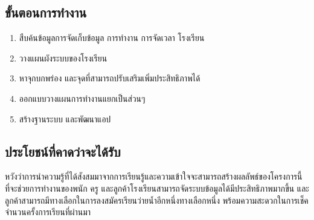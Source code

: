\subsection{ขั้นตอนการทำงาน}

\begin{enumerate}
    \item สืบค้นข้อมูลการจัดเก็บข้อมูล การทำงาน การจัดเวลา โรงเรียน
    \item วางแผนผังระบบของโรงเรียน
    \item หาจุกบกพร่อง และจุดที่สามารถปรับเสริมเพิ่มประสิทธิภาพได้
    \item ออกแบบวางแผนการทำงานแยกเป็นส่วนๆ
    \item สร้างฐานระบบ และพัฒนาแอป
\end{enumerate}

\subsection{ประโยชน์ที่คาดว่าจะได้รับ}

หวังว่าการนำความรู้ที่ได้สังสมมาจากการเรียนรู้และความเข้าใจจะสามารถสร้างผลลัพธ์ของโครงการนี้ ที่จะช่วยการทำงานของพนัก ครู และลูกค้าโรงเรียนสามารถจัดระบบข้อมูลได้มีประสิทธิภาพมากขึ้น และลูกค้าสามารถมีทางเลือกในการลงสมัครเรียนว่ายน้ำอีกหนึ่งทางเลือกหนึ่ง พร้อมความสะดวกในการเช็คจำนวนครั้งการเรียนที่ผ่านมา
